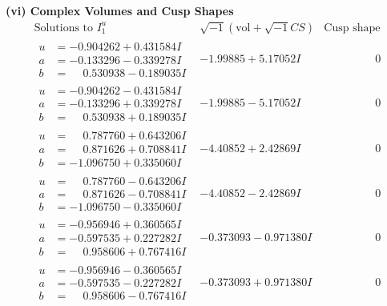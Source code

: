 \documentclass[1p]{elsarticle_modified}
\theoremstyle{definition}
\newcommand{\I}{\sqrt{-1}}
\begin{document}
\newpage\flushleft \textbf{(vi) Complex Volumes and Cusp Shapes}
$$\begin{array}{c|c|c}  
\text{Solutions to }I^u_{1}& \I (\text{vol} + \sqrt{-1}CS) & \text{Cusp shape}\\
 \hline 
\begin{aligned}
u &= -0.904262 + 0.431584 I \\
a &= -0.133296 - 0.339278 I \\
b &= \phantom{-}0.530938 - 0.189035 I\end{aligned}
 & -1.99885 + 5.17052 I & \phantom{-0.000000 } 0 \\ \hline\begin{aligned}
u &= -0.904262 - 0.431584 I \\
a &= -0.133296 + 0.339278 I \\
b &= \phantom{-}0.530938 + 0.189035 I\end{aligned}
 & -1.99885 - 5.17052 I & \phantom{-0.000000 } 0 \\ \hline\begin{aligned}
u &= \phantom{-}0.787760 + 0.643206 I \\
a &= \phantom{-}0.871626 + 0.708841 I \\
b &= -1.096750 + 0.335060 I\end{aligned}
 & -4.40852 + 2.42869 I & \phantom{-0.000000 } 0 \\ \hline\begin{aligned}
u &= \phantom{-}0.787760 - 0.643206 I \\
a &= \phantom{-}0.871626 - 0.708841 I \\
b &= -1.096750 - 0.335060 I\end{aligned}
 & -4.40852 - 2.42869 I & \phantom{-0.000000 } 0 \\ \hline\begin{aligned}
u &= -0.956946 + 0.360565 I \\
a &= -0.597535 + 0.227282 I \\
b &= \phantom{-}0.958606 + 0.767416 I\end{aligned}
 & -0.373093 - 0.971380 I & \phantom{-0.000000 } 0 \\ \hline\begin{aligned}
u &= -0.956946 - 0.360565 I \\
a &= -0.597535 - 0.227282 I \\
b &= \phantom{-}0.958606 - 0.767416 I\end{aligned}
 & -0.373093 + 0.971380 I & \phantom{-0.000000 } 0 \\ \hline\begin{aligned}

\end{aligned}
\end{array}$$
\end{document}
